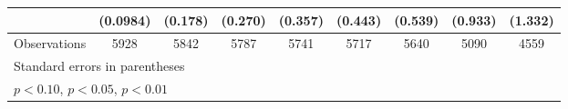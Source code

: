 \begin{table}[htbp]
\begin{tabular}{l*{8}{c}}
                    &    (0.0984)         &     (0.178)         &     (0.270)         &     (0.357)         &     (0.443)         &     (0.539)         &     (0.933)         &     (1.332)         \\
\hline
Observations        &        5928         &        5842         &        5787         &        5741         &        5717         &        5640         &        5090         &        4559         \\
\hline\hline
\multicolumn{9}{l}{\footnotesize Standard errors in parentheses}\\
\multicolumn{9}{l}{\footnotesize \sym{*} \(p<0.10\), \sym{**} \(p<0.05\), \sym{***} \(p<0.01\)}\\
\end{tabular}
\end{table}
